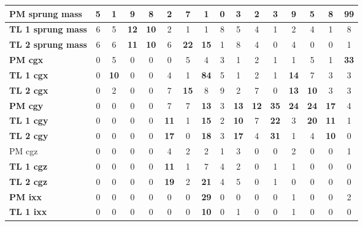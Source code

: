 \begin{table}[H]
\begin{tabular}{|l|c|c|c|c|c|c|c|c|c|c|c|c|c|c|c|}
\hline
\textcolor[rgb]{0.000, 0.447, 0.698}{\textbf{PM sprung mass}} & 5 & 1 & 9 & 8 & 2 & 7 & 1 & 0 & 3 & 2 & 3 & 9 & 5 & 8 & \textcolor[rgb]{0.000, 0.447, 0.698}{\textbf{99}} \\
\hline
\textbf{TL 1 sprung mass} & 6 & 5 & \textbf{12} & \textbf{10} & 2 & 1 & 1 & 8 & 5 & 4 & 1 & 2 & 4 & 1 & 8 \\
\hline
\textbf{TL 2 sprung mass} & 6 & 6 & \textbf{11} & \textbf{10} & 6 & \textbf{22} & \textbf{15} & 1 & 8 & 4 & 0 & 4 & 0 & 0 & 1 \\
\hline
\textcolor[rgb]{0.000, 0.620, 0.451}{\textbf{PM \gls{cgx}}} & 0 & 5 & 0 & 0 & 0 & 5 & 4 & 3 & 1 & 2 & 1 & 1 & 5 & 1 & \textcolor[rgb]{0.000, 0.620, 0.451}{\textbf{33}} \\
\hline
\textcolor[rgb]{0.000, 0.447, 0.698}{\textbf{TL 1 \gls{cgx}}} & 0 & \textbf{10} & 0 & 0 & 4 & 1 & \textcolor[rgb]{0.000, 0.447, 0.698}{\textbf{84}} & 5 & 1 & 2 & 1 & \textbf{14} & 7 & 3 & 3 \\
\hline
\textbf{TL 2 \gls{cgx}} & 0 & 2 & 0 & 0 & 7 & \textbf{15} & 8 & 9 & 2 & 7 & 0 & \textbf{13} & \textbf{10} & 3 & 3 \\
\hline
\textcolor[rgb]{0.000, 0.620, 0.451}{\textbf{PM \gls{cgy}}} & 0 & 0 & 0 & 0 & 7 & 7 & \textbf{13} & 3 & \textbf{13} & \textbf{12} & \textcolor[rgb]{0.000, 0.620, 0.451}{\textbf{35}} & \textbf{24} & \textbf{24} & \textbf{17} & 4 \\
\hline
\textbf{TL 1 \gls{cgy}} & 0 & 0 & 0 & 0 & \textbf{11} & 1 & \textbf{15} & 2 & \textbf{10} & 7 & \textbf{22} & 3 & \textbf{20} & \textbf{11} & 1 \\
\hline
\textcolor[rgb]{0.000, 0.620, 0.451}{\textbf{TL 2 \gls{cgy}}} & 0 & 0 & 0 & 0 & \textbf{17} & 0 & \textbf{18} & 3 & \textbf{17} & 4 & \textcolor[rgb]{0.000, 0.620, 0.451}{\textbf{31}} & 1 & 4 & \textbf{10} & 0 \\
\hline
PM \gls{cgz} & 0 & 0 & 0 & 0 & 4 & 2 & 2 & 1 & 3 & 0 & 0 & 2 & 0 & 0 & 1 \\
\hline
\textbf{TL 1 \gls{cgz}} & 0 & 0 & 0 & 0 & \textbf{11} & 1 & 7 & 4 & 2 & 0 & 1 & 1 & 0 & 0 & 0 \\
\hline
\textbf{TL 2 \gls{cgz}} & 0 & 0 & 0 & 0 & \textbf{19} & 2 & \textbf{21} & 4 & 5 & 0 & 1 & 0 & 0 & 0 & 0 \\
\hline
\textcolor[rgb]{0.000, 0.620, 0.451}{\textbf{PM \gls{ixx}}} & 0 & 0 & 0 & 0 & 0 & 0 & \textcolor[rgb]{0.000, 0.620, 0.451}{\textbf{29}} & 0 & 0 & 0 & 0 & 1 & 0 & 0 & 2 \\
\hline
\textbf{TL 1 \gls{ixx}} & 0 & 0 & 0 & 0 & 0 & 0 & \textbf{10} & 0 & 1 & 0 & 0 & 1 & 0 & 0 & 0 \\

\end{tabular}
\end{table}
